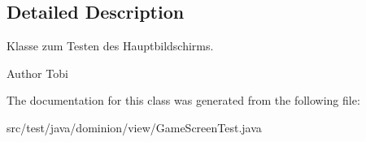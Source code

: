 \subsection{\-Detailed \-Description}
\-Klasse zum \-Testen des \-Hauptbildschirms.

\begin{DoxyAuthor}{\-Author}
\-Tobi 
\end{DoxyAuthor}


\-The documentation for this class was generated from the following file\-:\begin{DoxyCompactItemize}
\item 
src/test/java/dominion/view/\-Game\-Screen\-Test.\-java\end{DoxyCompactItemize}
